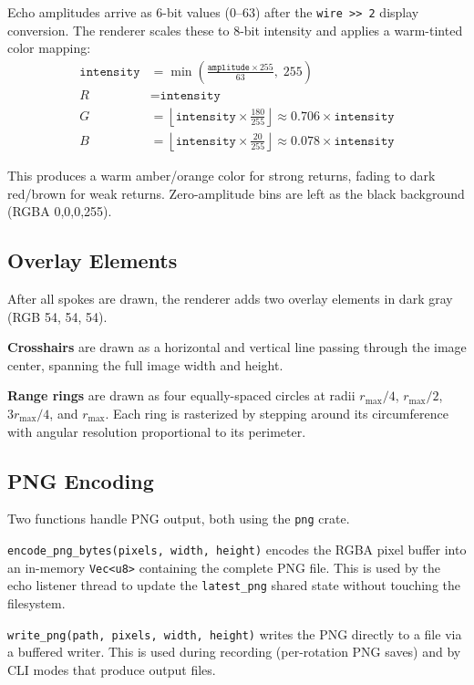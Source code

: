 \documentclass[11pt,letterpaper]{article}
\begin{document}
Echo amplitudes arrive as 6-bit values (0--63) after the \texttt{wire >> 2} display conversion. The renderer scales these to 8-bit intensity and applies a warm-tinted color mapping:
\begin{align}
\texttt{intensity} &= \min\!\left(\frac{\texttt{amplitude} \times 255}{63},\; 255\right) \\[4pt]
R &= \texttt{intensity} \\
G &= \left\lfloor \texttt{intensity} \times \frac{180}{255} \right\rfloor \approx 0.706 \times \texttt{intensity} \\
B &= \left\lfloor \texttt{intensity} \times \frac{20}{255} \right\rfloor \approx 0.078 \times \texttt{intensity}
\end{align}

This produces a warm amber/orange color for strong returns, fading to dark red/brown for weak returns. Zero-amplitude bins are left as the black background (RGBA 0,0,0,255).

\subsection{Overlay Elements}
\label{subsec:overlays}

After all spokes are drawn, the renderer adds two overlay elements in dark gray (RGB 54, 54, 54).

\textbf{Crosshairs} are drawn as a horizontal and vertical line passing through the image center, spanning the full image width and height.

\textbf{Range rings} are drawn as four equally-spaced circles at radii $r_{\max}/4$, $r_{\max}/2$, $3r_{\max}/4$, and $r_{\max}$. Each ring is rasterized by stepping around its circumference with angular resolution proportional to its perimeter.

\subsection{PNG Encoding}
\label{subsec:png-encoding}

Two functions handle PNG output, both using the \texttt{png} crate.

\texttt{encode\_png\_bytes(pixels, width, height)} encodes the RGBA pixel buffer into an in-memory \texttt{Vec<u8>} containing the complete PNG file. This is used by the echo listener thread to update the \texttt{latest\_png} shared state without touching the filesystem.

\texttt{write\_png(path, pixels, width, height)} writes the PNG directly to a file via a buffered writer. This is used during recording (per-rotation PNG saves) and by CLI modes that produce output files.
\end{document}
